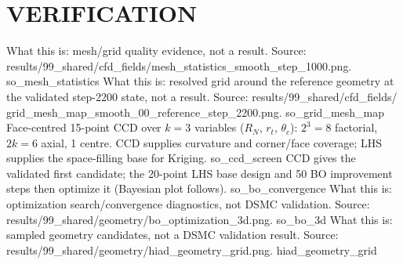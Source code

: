 \documentclass[aspectratio=169,11pt]{beamer}
\begin{document}
\section{VERIFICATION}
  {%
   What this is: mesh/grid quality evidence, not a result.
   Source: results/99\_shared/cfd\_fields/mesh\_statistics\_smooth\_step\_1000.png.}
  {so_mesh_statistics}
  {%
   What this is: resolved grid around the reference geometry at the validated
   step-2200 state, not a result. Source: results/99\_shared/cfd\_fields/
   grid\_mesh\_map\_smooth\_00\_reference\_step\_2200.png.}
  {so_grid_mesh_map}
  {%
   Face-centred 15-point CCD over $k=3$ variables ($R_N$, $r_t$, $\theta_c$):
   $2^3{=}8$ factorial, $2k{=}6$ axial, 1 centre. CCD supplies curvature and
   corner/face coverage; LHS supplies the space-filling base for Kriging.}
  {so_ccd_screen}
  {%
   CCD gives the validated first candidate; the 20-point LHS base design and
   50 BO improvement steps then optimize it (Bayesian plot follows).}
  {so_bo_convergence}
  {%
   What this is: optimization search/convergence diagnostics, not DSMC validation.
   Source: results/99\_shared/geometry/bo\_optimization\_3d.png.}
  {so_bo_3d}
  {%
   What this is: sampled geometry candidates, not a DSMC validation result.
   Source: results/99\_shared/geometry/hiad\_geometry\_grid.png.}
  {hiad_geometry_grid}
\end{document}
